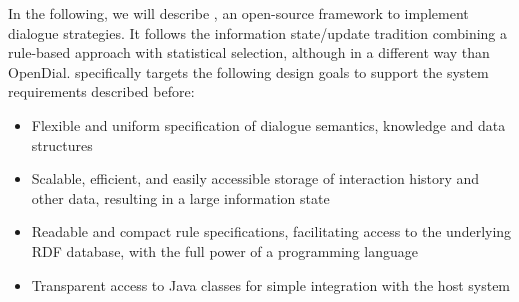 In the following, we will describe \vonda, an open-source framework to
implement dialogue strategies. It follows the information state/update
tradition \citep{traum2003information}
combining a rule-based approach with statistical selection, although in a
different way than OpenDial. \vonda specifically targets the following design
goals to support the system requirements described before:

\begin{itemize}
  \addtolength{\itemsep}{-.6\itemsep}
\item Flexible and uniform specification of dialogue semantics, knowledge and
  data structures
\item Scalable, efficient, and easily accessible storage of interaction history
  and other data, resulting in a large information state
\item Readable and compact rule specifications, facilitating access to the
  underlying RDF database, with the full power of a programming language
\item Transparent access to Java classes for simple integration with the host
  system
\end{itemize}
\fi

